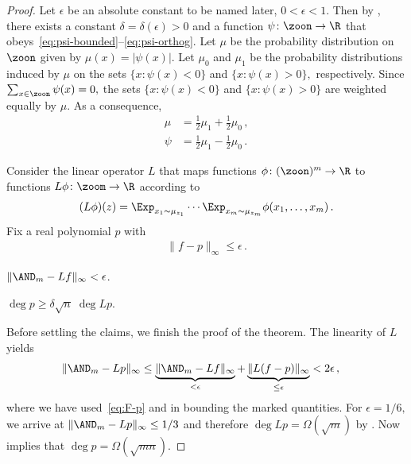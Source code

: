 \begin{proof}
Let $\epsilon$ be an absolute constant to be named later, $0<\epsilon<1$.
Then by , there exists a constant $\delta=\delta(\epsilon)>0$
and a function $\psi\colon\zoon\to\R$ that
obeys~\eqref{eq:psi-bounded}--\eqref{eq:psi-orthog}.
Let $\mu$ be the probability distribution on $\zoon$ given by $\mu(x)=|\psi(x)|$.
Let $\mu_0$ and $\mu_1$ be the probability distributions induced
by $\mu$ on the sets $\{x:\psi(x)<0\}$ and $\{x:\psi(x)>0\},$ respectively.
Since $\sum_{x\in\zoon}\psi(x)=0,$ the sets $\{x:\psi(x)<0\}$ and
$\{x:\psi(x)>0\}$ are weighted equally by $\mu$. As a consequence,
\begin{align}
\mu & =\frac12\mu_1+\frac12\mu_0\,,\label{eq:mu-mu0-mu1}\\
\psi & =\frac12\mu_1-\frac12\mu_0\,.\label{eq:psi-mu0-mu1}
\end{align}
 
 
Consider the linear operator $L$ that maps functions $\phi\colon(\zoon)^m\to\R$
to functions $L\phi\colon\zoom\to\R$ according to
\begin{align*}
(L\phi)(z)=\Exp_{x_1\sim\mu_{z_1}}\cdots\Exp_{x_m\sim\mu_{z_m}}\phi(x_1,\dots,x_m)\,.
\end{align*}
Fix a real polynomial $p$ with
\begin{align}
\|f-p\|_{\infty}\leq\epsilon\,.\label{eq:F-p}
\end{align}
 
\begin{claim} \label{cla:Lf-AND}
\quad $\|\AND_m-Lf\|_{\infty}<\epsilon$.
\end{claim}
 
\begin{claim}
\label{cla:deg}
\quad $\deg p\geq\delta\sqrt{n}\;\deg Lp$.
\end{claim}

Before settling the claims, we finish the proof of the theorem. The
linearity of $L$ yields
\begin{align*}
\|\AND_m-Lp\|_{\infty} & \leq\underbrace{\|\AND_m-Lf\|_{\infty}}_{<\epsilon}
+\underbrace{\|L(f-p)\|_{\infty}}_{\leq\epsilon}<2\epsilon\,,
\end{align*}
where we have used~\eqref{eq:F-p} and  in
bounding the marked quantities. For $\epsilon=1/6,$ we arrive at
$\|\AND_m-Lp\|_{\infty}\leq1/3$ and therefore $\deg Lp=\Omega(\sqrt{m})$
by . Now  implies
that $\deg p=\Omega(\sqrt{mn})$.
\end{proof}
 
